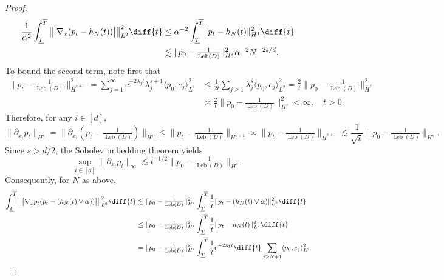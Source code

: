 \documentclass[a4paper, 11pt, headings = small, abstract]{scrartcl}
\begin{document}
\begin{proof}
\begin{equation}
\begin{split}
\frac{1}{\alpha^2} \int_{\underline{T}}^{\overline{T}} \big\lVert \big\lvert \nabla_x (p_t - h_N(t))\big\rvert \big\rVert^2_{L^2}\diff{t} &\leq  \alpha^{-2} \int_{\underline{T}}^{\overline{T}} \lVert p_t - h_N(t) \rVert_{H^1}^2 \diff{t} \\
&\lesssim \lVert p_0 - \tfrac{1}{\operatorname{Leb}(D)} \rVert^2_{H^s} \alpha^{-2} N^{-2s/d}.
\end{split}
\end{equation}
To bound the second term, note first that 
\begin{align*}
 \lVert p_t - \tfrac{1}{\operatorname{Leb}(D)} \rVert_{\bar{H}^{s+1}}^2 = \sum_{j=1}^\infty \mathrm{e}^{-2\lambda_j t} \lambda_j^{s+1} \langle p_0,e_j \rangle^2_{L^2}&\leq \frac{1}{2t}\sum_{j \geq 1} \lambda_j^s \langle p_0,e_j \rangle^2_{L^2} = \frac{2}{t}\lVert p_0 -\tfrac{1}{\operatorname{Leb}(D)}\rVert_{\bar{H}^s}^2\\ &\asymp \frac{2}{t}\lVert p_0 -\tfrac{1}{\operatorname{Leb}(D)}\rVert_{H^s}^2 < \infty, \quad t > 0.   
\end{align*}
Therefore, for any $i \in [d]$,
\[\lVert \partial_{x_i} p_t \rVert_{H^{s}} = \lVert \partial_{x_i} (p_t - \tfrac{1}{\operatorname{Leb}(D)}) \rVert_{H^{s}} \leq  \lVert p_t - \tfrac{1}{\operatorname{Leb}(D)} \rVert_{H^{s+1}} \asymp \lVert p_t - \tfrac{1}{\operatorname{Leb}(D)} \rVert_{\bar{H}^{s+1}} \lesssim \frac{1}{\sqrt{t}}\lVert p_0-\tfrac{1}{\operatorname{Leb}(D)} \rVert_{H^s}. \]
Since $s > d/2$, the Sobolev imbedding theorem yields
\begin{equation}\label{eq:uni_der2}
\sup_{i \in [d]} \lVert \partial_{x_i} p_t \rVert_\infty \lesssim t^{-1/2}\lVert p_0 -\tfrac{1}{\operatorname{Leb}(D)} \rVert_{H^s}.
\end{equation}
Consequently, for $N$ as above, 
\begin{equation}\label{eq:decomp22}
\begin{split}
\int_{\underline{T}}^{\overline{T}} \big\lVert \big\lvert \nabla_x p_t (p_t - (h_N(t) \vee \alpha)) \big\rvert \big\rVert^2_{L^2}\diff{t} &\lesssim \lVert p_0 -\tfrac{1}{\operatorname{Leb}(D)}\rVert_{H^s}^2\int_{ \underline{T}}^{\overline{T}} \frac{1}{t}\lVert p_t - (h_N(t) \vee \alpha) \rVert_{L^2}^2 \diff{t}\\ 
&\leq \lVert p_0 -\tfrac{1}{\operatorname{Leb}(D)}\rVert_{H^s}^2\int_{ \underline{T}}^{\overline{T}} \frac{1}{t}\lVert p_t - h_N(t) \rVert_{L^2}^2 \diff{t}\\ 
&= \lVert p_0 -\tfrac{1}{\operatorname{Leb}(D)}\rVert_{H^s}^2 \int_{ \underline{T}}^{\overline{T}} \frac{1}{t}\mathrm{e}^{-2\lambda_1 t} \diff{t} \sum_{j \geq N+1}\langle p_0, e_j \rangle^2_{L^2}\\

\end{split}
\end{equation}
\end{proof}
\end{document}
